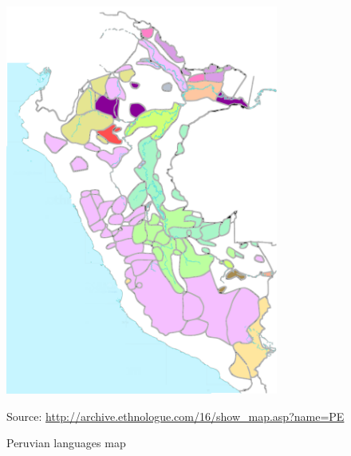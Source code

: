 \begin{figure}[!ht]
\begin{center}
\includegraphics[width=0.8\textwidth]{figures/yauyos1borders.pdf}
\end{center}
\caption{Peruvian languages map}\label{Figcomp}
\raggedright
{\scriptsize Source: \url{http://archive.ethnologue.com/16/show_map.asp?name=PE}}
\end{figure}

